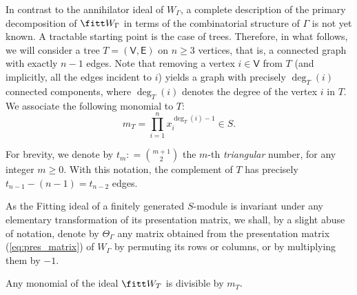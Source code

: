 \documentclass[10pt, leqno]{amsart}
\begin{document}
In contrast to the annihilator ideal of $W_\Gamma$, a complete description of the primary decomposition of $\fitt W_\Gamma$ in terms of the combinatorial structure of $\Gamma$ is not yet known. A tractable starting point is the case of trees. Therefore, in what follows, we will consider a tree $T = (\mathsf{V}, \mathsf{E})$ on $n \ge 3$ vertices, that is, a connected graph with exactly $n - 1$ edges. Note that removing a vertex $i \in \mathsf{V}$ from $T$ (and implicitly, all the edges incident to $i$) yields a graph with precisely $\deg_T(i)$ connected components, where $\deg_T(i)$ denotes the degree of the vertex $i$ in $T$. We associate the following monomial to $T$:
\begin{equation} \label{eq:m_T}
m_T = \prod_{i=1}^n x_i^{\deg_T(i) - 1} \in S .
\end{equation}

\begin{notation}
For brevity, we denote by $t_{m} : = \binom{m+1}{2}$ the $m$-th \emph{triangular} number, for any integer $m \ge 0$. With this notation, the complement of $T$ has precisely $t_{n-1} - (n-1) = t_{n-2}$ edges.
\end{notation}
    
\begin{obs}
As the Fitting ideal of a finitely generated $S$-module is invariant under any elementary transformation of its presentation matrix, we shall, by a slight abuse of notation, denote by $\Theta_\Gamma$ any matrix obtained from the presentation matrix (\ref{eq:pres_matrix}) of $W_\Gamma$ by permuting its rows or columns, or by multiplying them by $-1$.
\end{obs}

\begin{lem} \label{lem_tree_part1}
Any monomial of the ideal $\fitt W_T$ is divisible by $m_T$.
\end{lem}
\end{document}

